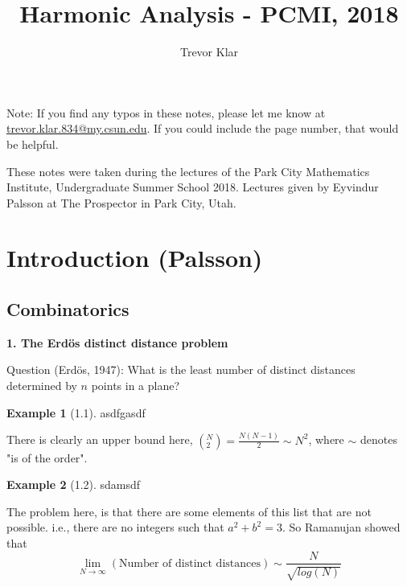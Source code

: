 \documentclass[a5paper]{article}
\title{Harmonic Analysis - PCMI, 2018}
\author{Trevor Klar}
\theoremstyle{definition}%
\newtheorem*{example*}{Example}
\numberwithin{exercise}{section}
\theoremstyle{remark}%
\begin{document}
\maketitle

\tableofcontents


\begin{highlight}
Note: If you find any typos in these notes, please let me know at \\ \href{mailto:trevor.klar.834@my.csun.edu}{trevor.klar.834@my.csun.edu}. If you could include the page number, that would be helpful. 

These notes were taken during the lectures of the Park City Mathematics Institute, Undergraduate Summer School 2018. Lectures given by Eyvindur Palsson at The Prospector in Park City, Utah.

\end{highlight}

\pagebreak
\section{Introduction (Palsson)}

\subsection{Combinatorics}
\textbf{1. The Erd\"os distinct distance problem}

Question (Erd\"os, 1947): What is the least number of distinct distances determined by $n$ points in a plane?

\begin{example*}[1.1]
asdfgasdf
\end{example*}

There is clearly an upper bound here, $\left({}^N_2\right)=\frac{N(N-1)}{2}\sim N^2$, where $\sim $ denotes "is of the order". 

\begin{example*}[1.2]
sdamsdf
\end{example*}
The problem here, is that there are some elements of this list that are not possible. i.e., there are no integers such that $a^2+b^2=3$. So Ramanujan showed that 
$$\lim_{N\to\infty}(\text{Number of distinct distances})\sim \frac{N}{\sqrt{log(N)}}$$
\end{document}
